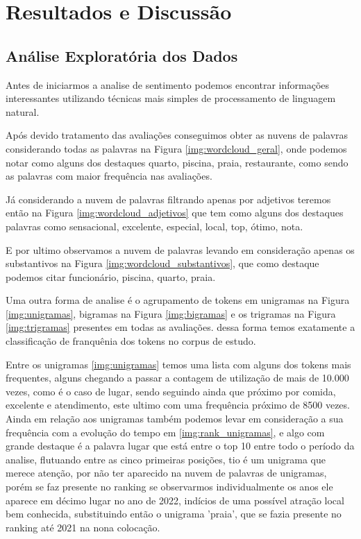 \chapter{Resultados e Discussão}
\label{cap:resultados}


\section{Análise Exploratória dos Dados}
\label{cap:resultados:sec:analise_exploratoria}

Antes de iniciarmos a analise de sentimento podemos encontrar informações interessantes utilizando técnicas mais simples de processamento de linguagem natural.

Após devido tratamento das avaliações conseguimos obter as nuvens de palavras considerando todas as palavras na Figura \ref{img:wordcloud_geral}, onde podemos notar como alguns dos destaques quarto, piscina, praia, restaurante, como sendo as palavras com maior frequência nas avaliações.


Já considerando a nuvem de palavras filtrando apenas por adjetivos teremos então na Figura \ref{img:wordcloud_adjetivos} que tem como alguns dos destaques palavras como sensacional, excelente, especial, local, top, ótimo, nota.

E por ultimo observamos a nuvem de palavras levando em consideração apenas os substantivos na Figura \ref{img:wordcloud_substantivos}, que como destaque podemos citar funcionário, piscina, quarto, praia.

Uma outra forma de analise é o agrupamento de tokens em unigramas na Figura \ref{img:unigramas}, bigramas na Figura \ref{img:bigramas} e os trigramas na Figura \ref{img:trigramas} presentes em todas as avaliações. dessa forma temos exatamente a classificação de franquênia dos tokens no corpus de estudo.

Entre os unigramas \ref{img:unigramas} temos uma lista com alguns dos tokens mais frequentes, alguns chegando a passar a contagem de utilização de mais de 10.000 vezes, como é o caso de lugar, sendo seguindo ainda que próximo por comida, excelente e atendimento, este ultimo com uma frequência próximo de 8500 vezes. Ainda em relação aos unigramas também podemos levar em consideração a sua frequência com a evolução do tempo em \ref{img:rank_unigramas}, e algo com grande destaque é a palavra lugar que está entre o top 10 entre todo o período da analise, flutuando entre as cinco primeiras posições, tio é um unigrama que merece atenção, por não ter aparecido na nuvem de palavras de unigramas, porém se faz presente no ranking se observarmos individualmente os anos ele aparece em décimo lugar no ano de 2022, indícios de uma possível atração local bem conhecida, substituindo então o unigrama 'praia', que se fazia presente no ranking até 2021 na nona colocação.


